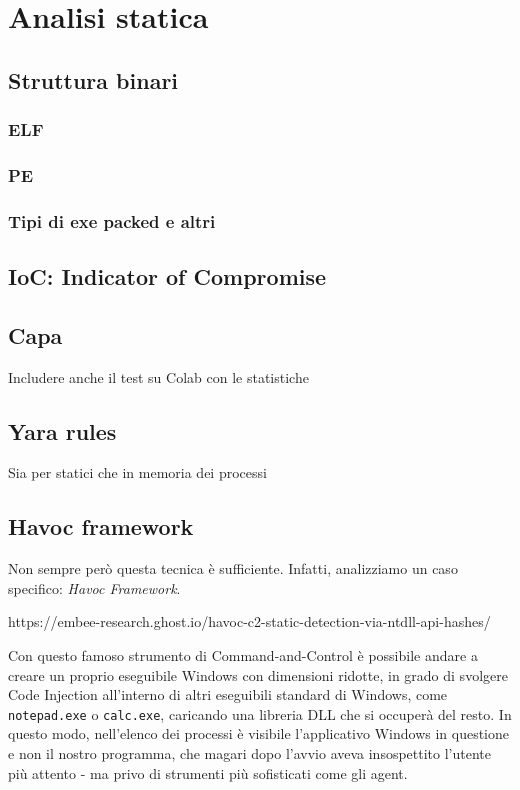 \chapter{Analisi statica}

\section{Struttura binari}

\subsection{ELF}

\subsection{PE}

\subsection{Tipi di exe packed e altri}

\section{IoC: Indicator of Compromise}

\section{Capa}
Includere anche il test su Colab con le statistiche

\section{Yara rules}
Sia per statici che in memoria dei processi 

\section{Havoc framework}
Non sempre però questa tecnica è sufficiente. Infatti, analizziamo un caso specifico: \emph{Havoc Framework}.

https://embee-research.ghost.io/havoc-c2-static-detection-via-ntdll-api-hashes/

Con questo famoso strumento di Command-and-Control è possibile andare a creare un proprio eseguibile Windows con dimensioni ridotte, in grado di svolgere Code Injection all'interno di altri eseguibili standard di Windows, come \texttt{notepad.exe} o \texttt{calc.exe}, caricando una libreria DLL che si occuperà del resto. In questo modo, nell'elenco dei processi è visibile l'applicativo Windows in questione e non il nostro programma, che magari dopo l'avvio aveva insospettito l'utente più attento - ma privo di strumenti più sofisticati come gli agent.
